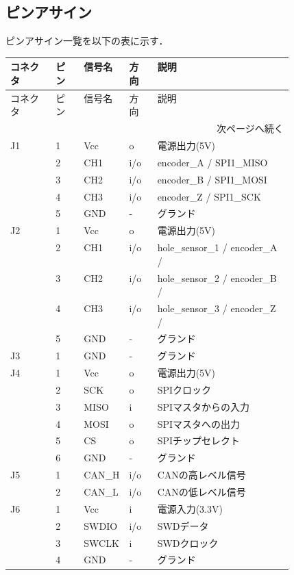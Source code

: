 \documentclass[autodetect-engine,11pt,a4paper,ja=standard]{bxjsarticle}
\begin{document}
\subsection{ピンアサイン}
ピンアサイン一覧を以下の表に示す．
\begin{longtable}{@{}l l l l p{0.48\linewidth}@{}}
\toprule
コネクタ & ピン & 信号名 & 方向 & 説明 \\
\midrule
\endfirsthead
\toprule
コネクタ & ピン & 信号名 & 方向 & 説明 \\
\midrule
\endhead
\midrule
\multicolumn{5}{r}{次ページへ続く}\\
\endfoot
\bottomrule
\endlastfoot

J1 & 1 & Vcc & o & 電源出力(5V) \\
~ & 2 & CH1 & i/o & encoder\_A / SPI1\_MISO \\
~ & 3 & CH2 & i/o & encoder\_B / SPI1\_MOSI \\
~ & 4 & CH3 & i/o & encoder\_Z / SPI1\_SCK \\
~ & 5 & GND & - & グランド \\
\midrule
J2 & 1 & Vcc & o & 電源出力(5V) \\
~ & 2 & CH1 & i/o & hole\_sensor\_1 / encoder\_A / \\
~ & 3 & CH2 & i/o & hole\_sensor\_2 / encoder\_B / \\
~ & 4 & CH3 & i/o & hole\_sensor\_3 / encoder\_Z / \\
~ & 5 & GND & - & グランド \\
\midrule
J3 & 1 & GND & - & グランド \\
\midrule
J4 & 1 & Vcc & o & 電源出力(5V) \\
~ & 2 & SCK & o & SPIクロック \\
~ & 3 & MISO & i & SPIマスタからの入力 \\
~ & 4 & MOSI & o & SPIマスタへの出力 \\
~ & 5 & CS & o & SPIチップセレクト \\
~ & 6 & GND & - & グランド \\
\midrule
J5 & 1 & CAN\_H & i/o & CANの高レベル信号 \\
~ & 2 & CAN\_L & i/o & CANの低レベル信号 \\
\midrule
J6 & 1 & Vcc & i & 電源入力(3.3V) \\
~ & 2 & SWDIO & i/o & SWDデータ \\
~ & 3 & SWCLK & i & SWDクロック \\
~ & 4 & GND & - & グランド \\

\end{longtable}
\end{document}
